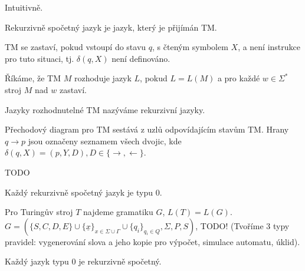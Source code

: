 \documentclass[12pt]{article}                   %
\begin{document}
    \begin{definice}
        Intuitivně.
    \end{definice}

    \begin{definice}
        Rekurzivně spočetný jazyk je jazyk, který je přijímán TM.
    \end{definice}

    \begin{definice}[TM se zastaví]
        TM se zastaví, pokud vstoupí do stavu $q$, s čteným symbolem $X$, a není instrukce pro tuto situaci, tj. $\delta(q, X)$ není definováno.
    \end{definice}

    \begin{definice}
        Říkáme, že TM $M$ rozhoduje jazyk $L$, pokud $L = L(M)$ a pro každé $w \in \Sigma^*$ stroj $M$ nad $w$ zastaví.

        Jazyky rozhodnutelné TM nazýváme rekurzivní jazyky.
    \end{definice}

    \begin{definice}
        Přechodový diagram pro TM sestává z uzlů odpovídajícím stavům TM. Hrany $q \rightarrow p$ jsou označeny seznamem všech dvojic, kde $\delta(q, X) = (p, Y, D), D \in \{\rightarrow, \leftarrow\}$.
    \end{definice}


    TODO

    \begin{veta}
        Každý rekurzivně spočetný jazyk je typu 0.

        \begin{dukazin}
            Pro Turingův stroj $T$ najdeme gramatiku $G$, $L(T) = L(G)$. $G = (\{S, C, D, E\} \cup \{\underline{x}\}_{x \in \Sigma\cup\Gamma}\cup \{q_i\}_{q_i \in Q}, \Sigma, P, S)$, TODO! (Tvoříme 3 typy pravidel: vygenerování slova a jeho kopie pro výpočet, simulace automatu, úklid).
        \end{dukazin}
    \end{veta}

    \begin{dukazin}
        Každý jazyk typu 0 je rekurzivně spočetný.
    \end{dukazin}

\end{document}
